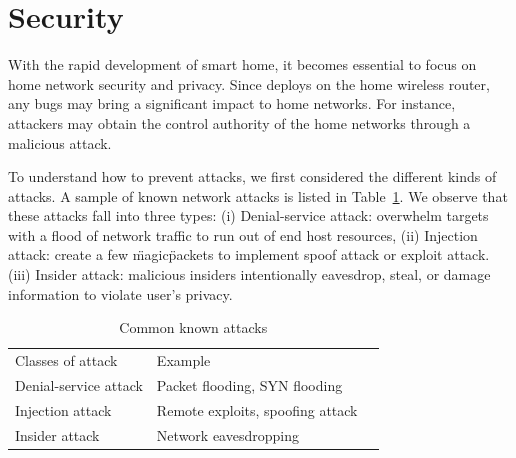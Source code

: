 \section{Security}
With the rapid development of smart home, it becomes essential to focus on home network security and privacy. Since \sysname deploys on the home wireless router, any bugs may bring a significant impact to home networks. For instance, attackers may obtain the control authority of the home networks through a malicious attack. 

To understand how to prevent attacks, we first considered the different kinds of attacks. A sample of known network attacks is listed in Table~\ref{table: attack}. We observe that these attacks fall into three types: (i) Denial-service attack: overwhelm targets with a flood of network traffic to run out of end host resources, (ii) Injection attack: create a few \"magic\" packets to implement spoof attack or exploit attack. (iii) Insider attack: malicious insiders intentionally eavesdrop, steal, or damage information to violate user's privacy.

\begin{table}[]
\centering
\begin{tabular}{|l|l|l}
\cline{1-2}
Classes of attack     & Example                                 &  \\ \cline{1-2}
Denial-service attack & Packet flooding, SYN flooding\cite{eddy2011syn}             &  \\ \cline{1-2}
Injection attack      & Remote exploits\cite{shellcode},  spoofing attack\cite{bishop1996attack} &  \\ \cline{1-2}
Insider attack        & Network eavesdropping                   &  \\ \cline{1-2}
\end{tabular}
\caption{Common known attacks}
\label{table: attack}
\end{table}


